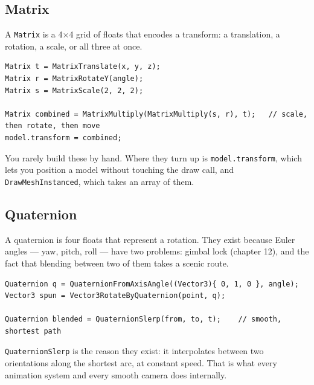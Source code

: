 
\subsection{Matrix}

A \lstinline|Matrix| is a 4$\times$4 grid of floats that encodes a transform:
a translation, a rotation, a scale, or all three at once.

\begin{lstlisting}
Matrix t = MatrixTranslate(x, y, z);
Matrix r = MatrixRotateY(angle);
Matrix s = MatrixScale(2, 2, 2);

Matrix combined = MatrixMultiply(MatrixMultiply(s, r), t);   // scale, then rotate, then move
model.transform = combined;
\end{lstlisting}


You rarely build these by hand. Where they turn up is
\lstinline|model.transform|, which lets you position a model without touching the
draw call, and \lstinline|DrawMeshInstanced|, which takes an array of them.

\subsection{Quaternion}

A quaternion is four floats that represent a rotation. They exist because Euler
angles --- yaw, pitch, roll --- have two problems: gimbal lock (chapter 12), and
the fact that blending between two of them takes a scenic route.

\begin{lstlisting}
Quaternion q = QuaternionFromAxisAngle((Vector3){ 0, 1, 0 }, angle);
Vector3 spun = Vector3RotateByQuaternion(point, q);

Quaternion blended = QuaternionSlerp(from, to, t);    // smooth, shortest path
\end{lstlisting}

\lstinline|QuaternionSlerp| is the reason they exist: it interpolates between two
orientations along the shortest arc, at constant speed. That is what every
animation system and every smooth camera does internally.

